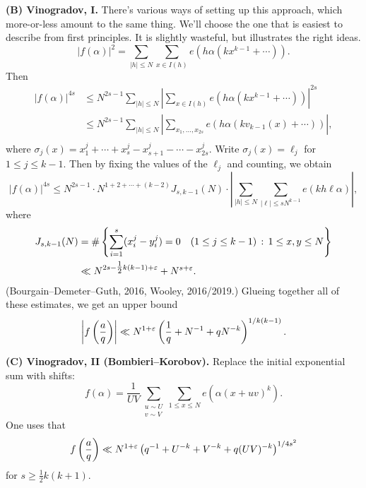 \documentclass[reqno]{amsart} 
\numberwithin{theorem}{section}
\numberwithin{equation}{section}
\begin{document}
\textbf{(B) Vinogradov, I.}  There's various ways of setting up this approach, which more-or-less amount to the same thing.  We'll choose the one that is easiest to describe from first principles.  It is slightly wasteful, but illustrates the right ideas.
\begin{equation*}
  \left\lvert f(\alpha) \right\rvert^2 = \sum_{\lvert h \rvert \leq N}
  \sum_{x \in I(h)} e \left( h \alpha(k x^{k - 1} + \dotsb) \right).
\end{equation*}
Then
\begin{align*}
  \left\lvert f(\alpha) \right\rvert^{4 s}
  &\leq N^{2 s - 1} \sum_{\lvert h \rvert \leq N}
  \left\lvert
    \sum_{x \in I(h)}
    e \left( h \alpha(k x^{k - 1} + \dotsb) \right)
    \right\rvert^{2 s} \\
  &\leq N^{2 s - 1} \sum_{\lvert h \rvert \leq N}
    \left\lvert
    \sum_{x_1, \dotsc, x_{2 s}}
    e \left( h \alpha(k v_{k - 1}(x) + \dotsb) \right)
    \right\rvert, \\
\end{align*}
where $\sigma_j(x) = x_1^j + \dotsb + x_s^j - x_{s + 1}^j - \dotsb - x_{2 s}^j$.  Write $\sigma_j(x) = \ell_j$ for $1 \leq j \leq k - 1$.  Then by fixing the values of the $\ell_j$ and counting, we obtain
\begin{equation*}
  \lvert f(\alpha) \rvert^{4 s} \leq N^{2 s - 1}
  \cdot N^{1 + 2 + \dotsb +(k - 2)}
  J_{s, k - 1}(N) \cdot \left\lvert \sum_{\lvert h \rvert \leq N} \sum_{\lvert \ell \rvert \leq s N^{k - 1}}
    e \left( k h \ell \alpha \right)\right\rvert,
\end{equation*}
where
\begin{align*}
  J_{s, k - 1}(N)
  &= \# \left\{ \sum_{i = 1}^s
    (x_i^j - y_i^j) = 0 \quad (1 \leq j \leq k - 1) \, : \, 1 \leq x, y \leq N \right\} \\
  &\ll
    N^{2 s - \tfrac{1}{2} k(k - 1) + \varepsilon}
    + N^{s + \varepsilon}.
\end{align*}
(Bourgain--Demeter--Guth, 2016, Wooley, 2016/2019.)  Glueing together all of these estimates, we get an upper bound
\begin{equation*}
  \left\lvert f \left( \frac{a}{q} \right) \right\rvert \ll N^{1 + \varepsilon} \left( \frac{1}{q} + N^{-1} + q N^{- k} \right)^{1/k(k - 1)}.
\end{equation*}

\textbf{(C) Vinogradov, II (Bombieri--Korobov).}  Replace the initial exponential sum with shifts:
\begin{equation*}
  f(\alpha) =
  \frac{1}{U V}
  \sum_{
    \substack{
      u \sim U  \\
      v \sim V
    }
  }
  \sum_{1 \leq x \leq N} e \left( \alpha(x + u v)^k \right).
\end{equation*}
One uses that
\begin{equation*}
  f \left( \frac{a}{q} \right)
  \ll N^{1 + \varepsilon} \left( q^{-1} + U^{- k} + V^{- k} + q(U V)^{- k} \right)^{1/4 s^2}
\end{equation*}
for $s \geq \tfrac{1}{2} k(k + 1)$.
\end{document}
